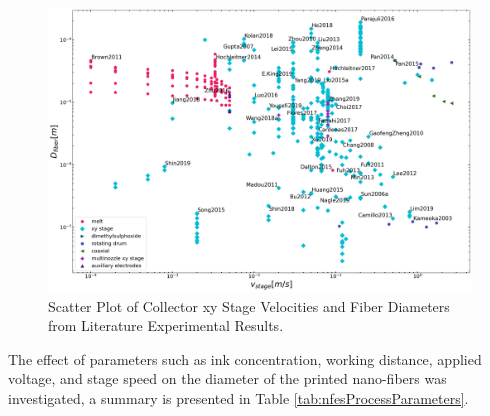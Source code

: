 \begin{figure}[!th]
\centering
\includegraphics[width=\textwidth]{./Figures/plt_vstagems_vs_Dfiberm.png}
\decoRule
\caption[Scatter Plot of Collector xy Stage Velocities and Fiber Diameters from Literature Experimental Results]{Scatter Plot of Collector xy Stage Velocities and Fiber Diameters from Literature Experimental Results. \cite{
  Yang2019,Fattahi2017,Shin2019,Wang2015,Parajuli2016,Zheng2010,Fuh2011,Dalton2015,
  Ru2014,Xue2014,Wang2017,Xu2014,Liu2013,Pan2014,Canton2014,Chakraborty2009,Gupta2007,
  He2018,Zhou2011,Chen2013,Williams2018,Choi2017,Pan2019,Lei2015,Lim2019,Park2020,
  Fuh2012,Flores2017,Chang2010,Xu2019,Zhang2019,Shin2018,Fuh2015,Nagle2019,Zheng2012,
  Kameoka2003a,Liu2014,E.King2019,Hochleitner2017,Madou2011,Jiang2018,Husain2016,
  ElectrospinTech2015,Brown2011,Kolan2018,Chang2011,Beachley2011,Camillo2013,Kameoka2003,
  Bu2012,Lee2012,Huang2015,Coppola2020,CisquellaSerra2019,Ruggieri2013,Hochleitner2014,
  Zhu2016,Brown2014,Chang2008,Sonntag2020,Kim2018,Deng2020,Han2019,George2020,Sun2006a,
  Pan2015,Shen2016,Strauss2019,Fuh2013,Sarkar2007,You2017,Wang2018a,Zheng2014,Song2015,
  GaofengZheng2010,Liu2015a,Min2013,Luo2016,Yousefi2019,Cardenas2017,Coppola2014}}
\label{fig:plt_vstagems_vs_Dfiberm}
\end{figure}


The effect of parameters such as ink concentration, working distance, applied voltage, and stage speed on the diameter of the printed nano-fibers was investigated, a summary is presented in Table \ref{tab:nfesProcessParameters}.


